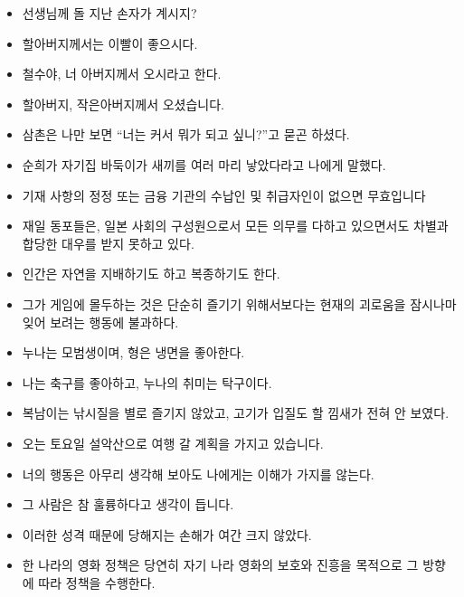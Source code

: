 \documentclass[10pt]{report}
\begin{document}
\begin{itemize}
\item
선생님께 돌 지난 손자가 계시지? 

\item
할아버지께서는 이빨이 좋으시다. 

\item
철수야, 너 아버지께서 오시라고 한다. 

\item
할아버지, 작은아버지께서 오셨습니다.

\item
삼촌은 나만 보면 “너는 커서 뭐가 되고 싶니?”고 묻곤 하셨다.

\item
순희가 자기집 바둑이가 새끼를 여러 마리 낳았다라고 나에게 말했다.

\item
기재 사항의 정정 또는 금융 기관의 수납인 및 취급자인이 없으면 무효입니다

\item
재일 동포들은, 일본 사회의 구성원으로서 모든 의무를 다하고 있으면서도 차별과 합당한 대우를 받지 못하고 있다.

\item
인간은 자연을 지배하기도 하고 복종하기도 한다.

\item
그가 게임에 몰두하는 것은 단순히 즐기기 위해서보다는 현재의 괴로움을 잠시나마 잊어 보려는 행동에 불과하다. 

\item
누나는 모범생이며, 형은 냉면을 좋아한다. 

\item
나는 축구를 좋아하고, 누나의 취미는 탁구이다. 

\item
복남이는 낚시질을 별로 즐기지 않았고, 고기가 입질도 할 낌새가 전혀 안 보였다. 

\item
오는 토요일 설악산으로 여행 갈 계획을 가지고 있습니다. 

\item
너의 행동은 아무리 생각해 보아도 나에게는 이해가 가지를 않는다.

\item
그 사람은 참 훌륭하다고 생각이 듭니다.

\item
이러한 성격 때문에 당해지는 손해가 여간 크지 않았다. 
\item
한 나라의 영화 정책은 당연히 자기 나라 영화의 보호와 진흥을 목적으로 그 방향에 따라 정책을 수행한다.


\end{itemize}
\end{document}
